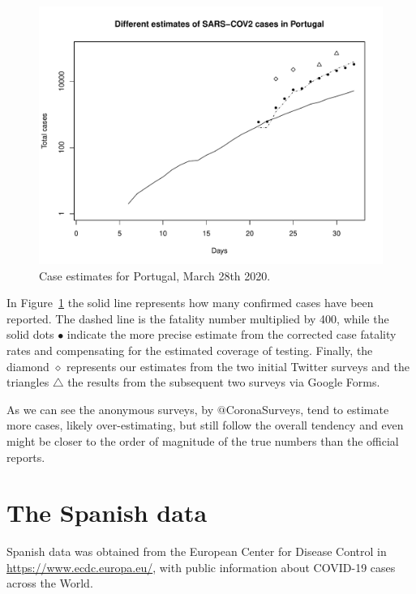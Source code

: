 \documentclass{article}
\begin{document}
\begin{figure}
\begin{center}
\includegraphics[width=.9\linewidth]{EstPTMar28.pdf}
\end{center}
\caption{Case estimates for Portugal, March 28th 2020.}
\label{pt}
\end{figure}

In Figure~\ref{pt} the solid line represents how many confirmed cases have been reported. The dashed line is the fatality number multiplied by 400, while the solid dots $\bullet$ indicate the more precise estimate from the corrected case fatality rates and compensating for the estimated coverage of testing. Finally, the diamond $\diamond$ represents our estimates from the two initial Twitter surveys and the triangles $\triangle$ the results from the subsequent two surveys via Google Forms. 

As we can see the anonymous surveys, by $@$CoronaSurveys, tend to estimate more cases, likely over-estimating, but still follow the overall tendency and even might be closer to the order of magnitude of the true numbers than the official reports. 

\section{The Spanish data}

Spanish data was obtained from the European Center for Disease Control in \url{https://www.ecdc.europa.eu/}, with public information about COVID-19 cases across the World. 
\end{document}
